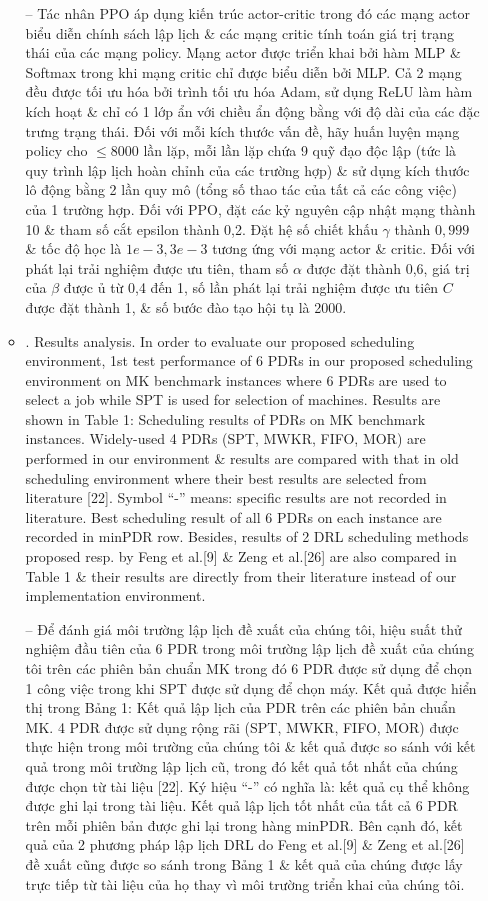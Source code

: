 \documentclass{article}
\begin{document}
\begin{itemize}
\begin{itemize}
        -- Tác nhân PPO áp dụng kiến trúc actor-critic trong đó các mạng actor biểu diễn chính sách lập lịch \& các mạng critic tính toán giá trị trạng thái của các mạng policy. Mạng actor được triển khai bởi hàm MLP \& Softmax trong khi mạng critic chỉ được biểu diễn bởi MLP. Cả 2 mạng đều được tối ưu hóa bởi trình tối ưu hóa Adam, sử dụng ReLU làm hàm kích hoạt \& chỉ có 1 lớp ẩn với chiều ẩn động bằng với độ dài của các đặc trưng trạng thái. Đối với mỗi kích thước vấn đề, hãy huấn luyện mạng policy cho $\le8000$ lần lặp, mỗi lần lặp chứa 9 quỹ đạo độc lập (tức là quy trình lập lịch hoàn chỉnh của các trường hợp) \& sử dụng kích thước lô động bằng 2 lần quy mô (tổng số thao tác của tất cả các công việc) của 1 trường hợp. Đối với PPO, đặt các kỷ nguyên cập nhật mạng thành 10 \& tham số cắt epsilon thành 0,2. Đặt hệ số chiết khấu $\gamma$ thành $0,999$ \& tốc độ học là $1e-3,3e-3$ tương ứng với mạng actor \& critic. Đối với phát lại trải nghiệm được ưu tiên, tham số $\alpha$ được đặt thành 0,6, giá trị của $\beta$ được ủ từ 0,4 đến 1, số lần phát lại trải nghiệm được ưu tiên $C$ được đặt thành 1, \& số bước đào tạo hội tụ là 2000.
        \item {. Results analysis.} In order to evaluate our proposed scheduling environment, 1st test performance of 6 PDRs in our proposed scheduling environment on MK benchmark instances where 6 PDRs are used to select a job while SPT is used for selection of machines. Results are shown in {\sf Table 1: Scheduling results of PDRs on MK benchmark instances}. Widely-used 4 PDRs (SPT, MWKR, FIFO, MOR) are performed in our environment \& results are compared with that in old scheduling environment where their best results are selected from literature [22]. Symbol ``-'' means: specific results are not recorded in literature. Best scheduling result of all 6 PDRs on each instance are recorded in minPDR row. Besides, results of 2 DRL scheduling methods proposed resp. by Feng et al.[9] \& Zeng et al.[26] are also compared in Table 1 \& their results are directly from their literature instead of our implementation environment.

        -- Để đánh giá môi trường lập lịch đề xuất của chúng tôi, hiệu suất thử nghiệm đầu tiên của 6 PDR trong môi trường lập lịch đề xuất của chúng tôi trên các phiên bản chuẩn MK trong đó 6 PDR được sử dụng để chọn 1 công việc trong khi SPT được sử dụng để chọn máy. Kết quả được hiển thị trong {\sf Bảng 1: Kết quả lập lịch của PDR trên các phiên bản chuẩn MK}. 4 PDR được sử dụng rộng rãi (SPT, MWKR, FIFO, MOR) được thực hiện trong môi trường của chúng tôi \& kết quả được so sánh với kết quả trong môi trường lập lịch cũ, trong đó kết quả tốt nhất của chúng được chọn từ tài liệu [22]. Ký hiệu ``-'' có nghĩa là: kết quả cụ thể không được ghi lại trong tài liệu. Kết quả lập lịch tốt nhất của tất cả 6 PDR trên mỗi phiên bản được ghi lại trong hàng minPDR. Bên cạnh đó, kết quả của 2 phương pháp lập lịch DRL do Feng et al.[9] \& Zeng et al.[26] đề xuất cũng được so sánh trong Bảng 1 \& kết quả của chúng được lấy trực tiếp từ tài liệu của họ thay vì môi trường triển khai của chúng tôi.


\end{itemize}
\end{itemize}
\end{document}

